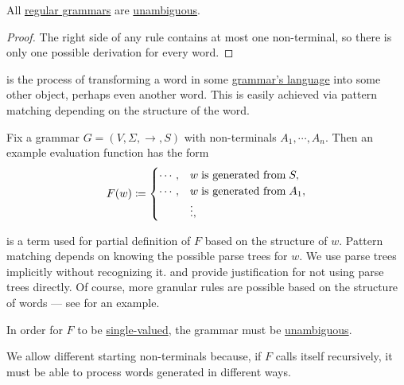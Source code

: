 \begin{proposition}\label{thm:regular_grammars_are_unambiguous}
  All \hyperref[def:chomsky_hierarchy/regular]{regular grammars} are \hyperref[def:grammar_ambiguity]{unambiguous}.
\end{proposition}
\begin{proof}
  The right side of any rule contains at most one non-terminal, so there is only one possible derivation for every word.
\end{proof}

\begin{remark}\label{rem:evaluation}
   is the process of transforming a word in some \hyperref[def:formal_grammar/language]{grammar's language} into some other object, perhaps even another word. This is easily achieved via pattern matching depending on the structure of the word.

  Fix a grammar \( G = (V, \Sigma, \to, S) \) with non-terminals \( A_1, \cdots, A_n \). Then an example evaluation function has the form
  \begin{equation}\label{eq:rem:evaluation}
    F(w) \coloneqq \begin{cases}
      \cdots, &w \T{is generated from} S, \\
      \cdots, &w \T{is generated from} A_1, \\
              &\vdots,
    \end{cases}
  \end{equation}

   is a term used for partial definition of \( F \) based on the structure of \( w \). Pattern matching depends on knowing the possible parse trees for \( w \). We use parse trees implicitly without recognizing it.  and  provide justification for not using parse trees directly. Of course, more granular rules are possible based on the structure of words --- see  for an example.
\end{remark}
\begin{comments}
  \item In order for \( F \) to be \hyperref[def:function]{single-valued}, the grammar must be \hyperref[def:grammar_ambiguity]{unambiguous}.
  \item We allow different starting non-terminals because, if \( F \) calls itself recursively, it must be able to process words generated in different ways.
\end{comments}

